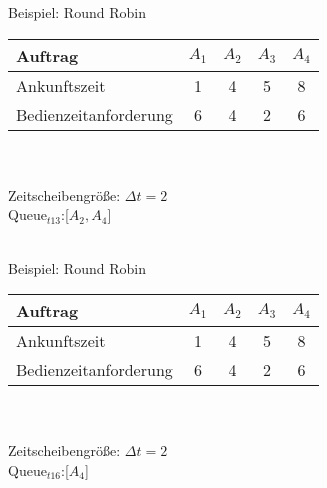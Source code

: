 \begin{frame}{Beispiel: Round Robin}
	\begin{tabular}{l||c|c|c|c}
		Auftrag               & \(A_1\)  & \(A_2\)  & \(A_3\) & \(A_4\) \\ \hline \hline
		Ankunftszeit		  & 1        &  4		& 5       & 8       \\ \hline
		Bedienzeitanforderung & 6        &  4       & 2       & 6       \\
	\end{tabular}\quad \\ \quad \\
	Zeitscheibengröße: \(\Delta t = 2\) \\
	Queue\(_{t13}\):[\(A_2,A_4\)] \\
	\quad \\
	\begin{center}
	\begin{blockgraph}{25}{1}{0.4}
    
    \end{blockgraph}
	\end{center}
\end{frame}

\begin{frame}{Beispiel: Round Robin}
	\begin{tabular}{l||c|c|c|c}
		Auftrag               & \(A_1\)  & \(A_2\)  & \(A_3\) & \(A_4\) \\ \hline \hline
		Ankunftszeit		  & 1        &  4		& 5       & 8       \\ \hline
		Bedienzeitanforderung & 6        &  4       & 2       & 6       \\
	\end{tabular}\quad \\ \quad \\
	Zeitscheibengröße: \(\Delta t = 2\) \\
	Queue\(_{t16}\):[\(A_4\)] \\
	\quad \\
	\begin{center}
	\begin{blockgraph}{25}{1}{0.4}
    
    \end{blockgraph}
	\end{center}
\end{frame}

